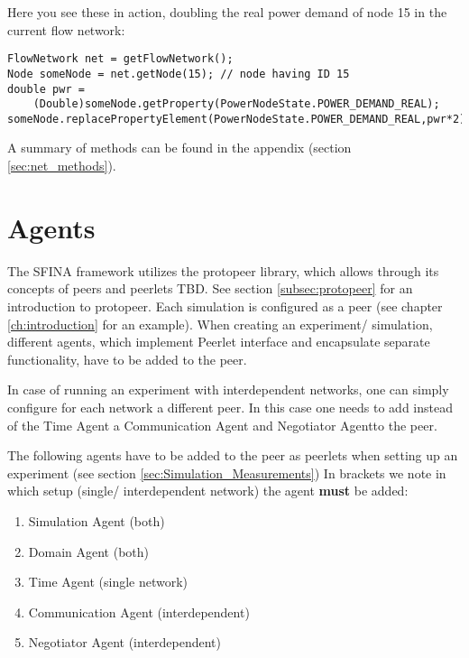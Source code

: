 \documentclass[11pt,fleqn]{book} %
\newcommand{\MainAgent}{Simulation Agent }
\newcommand{\TimeAgent}{Time Agent }
\newcommand{\CommunicationAgent}{Communication Agent }
\newcommand{\DomainAgent}{Domain Agent} %
\newcommand{\NegotiatorAgent}{Negotiator Agent}
\begin{document}
Here you see these in action, doubling the real power demand of node 15 in the current flow network:
\begin{lstlisting}[frame=single] 
FlowNetwork net = getFlowNetwork();
Node someNode = net.getNode(15); // node having ID 15
double pwr = 
	(Double)someNode.getProperty(PowerNodeState.POWER_DEMAND_REAL);
someNode.replacePropertyElement(PowerNodeState.POWER_DEMAND_REAL,pwr*2);
\end{lstlisting}

A summary of methods can be found in the appendix (section \ref{sec:net_methods}).



\chapter{Agents}\label{sec:agents}
The SFINA framework utilizes the protopeer library, which allows through its concepts of peers and peerlets TBD. See section \ref{subsec:protopeer} for an introduction to protopeer.
Each simulation is configured as a peer (see chapter \ref{ch:introduction} for an example). When creating an experiment/ simulation, different agents, which implement Peerlet interface and encapsulate separate functionality, have to be added to the peer. 

In case of running an experiment with interdependent networks, one can simply configure for each network a different peer. In this case one needs to add instead of the \TimeAgent a \CommunicationAgent and \NegotiatorAgent to the peer.

 The following agents have to be added to the peer as peerlets when setting up an experiment (see section \ref{sec:Simulation_Measurements}) In brackets we note in which setup (single/ interdependent network) the agent \textbf{must} be added:
 \\
\begin{enumerate}
	\item \MainAgent \tabto{4cm} (both)
	\item \DomainAgent \tabto{4cm} (both)
	\item \TimeAgent \tabto{4cm} (single network)
	\item \CommunicationAgent  \tabto{4cm} (interdependent)
	\item \NegotiatorAgent \tabto{4cm} (interdependent)
\end{enumerate}
\end{document}

